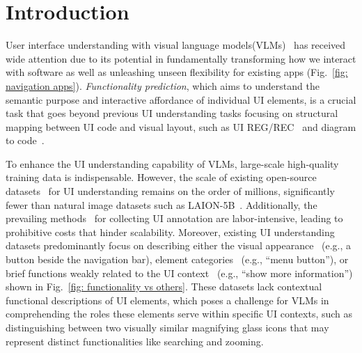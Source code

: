 \section{Introduction}

User interface understanding with visual language models(VLMs)~\citep{hong2023cogagent,cheng2024seeclick,you2024ferret,lee2023pix2struct,baechler2024screenai} has received wide attention due to its potential in fundamentally transforming how we interact with software as well as unleashing unseen flexibility for existing apps (Fig.~\ref{fig: navigation apps}). 
\emph{Functionality prediction}, which aims to understand the semantic purpose and interactive affordance of individual UI elements, is a crucial task that goes beyond previous UI understanding tasks focusing on structural mapping between UI code and visual layout, such as UI REG/REC~\citep{hong2023cogagent,Li2020WidgetCG} and diagram to code~\citep{xia2024chartx, liu2023deplot}.

To enhance the UI understanding capability of VLMs, large-scale high-quality training data is indispensable.
However, the scale of existing open-source datasets~\citep{Li2020WidgetCG,Deka2017RicoAM,Li2020MappingNL,kapoor2024omniact,Wang2021Screen2WordsAM} for UI understanding remains on the order of millions, significantly fewer than natural image datasets such as LAION-5B~\citep{LAION5B}.
Additionally, the prevailing methods~\citep{Deka2017RicoAM,Li2020WidgetCG} for collecting UI annotation are labor-intensive, leading to prohibitive costs that hinder scalability.
Moreover, existing UI understanding datasets predominantly focus on describing either the visual appearance~\citep{Li2020WidgetCG,Li2020MappingNL} (e.g., a button beside the navigation bar), element categories~\citep{cheng2024seeclick} (e.g., ``menu button''), or brief functions weakly related to the UI context~\citep{Bai2021UIBertLG} (e.g., ``show more information'') shown in Fig.~\ref{fig: functionality vs others}.
These datasets lack contextual functional descriptions of UI elements, which poses a challenge for VLMs in comprehending the roles these elements serve within specific UI contexts, such as distinguishing between two visually similar magnifying glass icons that may represent distinct functionalities like searching and zooming.



